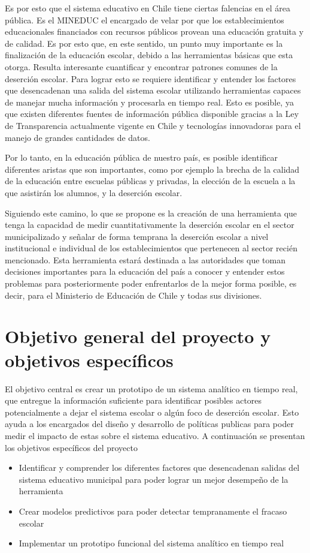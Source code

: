 Es por esto que el sistema educativo en Chile tiene ciertas falencias en el área pública. Es el MINEDUC el encargado de velar por que los establecimientos educacionales financiados con recursos públicos provean una educación gratuita y de calidad. Es por esto que, en este sentido, un punto muy importante es la finalización de la educación escolar, debido a las herramientas básicas que esta otorga. Resulta interesante cuantificar y encontrar patrones comunes de la deserción escolar. Para lograr esto se requiere identificar y entender los factores que desencadenan una salida del sistema escolar utilizando herramientas capaces de manejar mucha información y procesarla en tiempo real. Esto es posible, ya que existen diferentes fuentes de información pública disponible gracias a la Ley de Transparencia \cite{ley} actualmente vigente en Chile y tecnologías innovadoras para el manejo de grandes cantidades de datos.

Por lo tanto, en la educación pública de nuestro país, es posible identificar diferentes aristas que son importantes, como por ejemplo la brecha de la calidad de la educación entre escuelas públicas y privadas, la elección de la escuela a la que asistirán los alumnos, y la deserción escolar.

Siguiendo este camino, lo que se propone es la creación de una herramienta que tenga la capacidad de medir cuantitativamente la deserción escolar en el sector municipalizado y señalar de forma temprana la deserción escolar a nivel institucional e individual de los establecimientos que pertenecen al sector recién mencionado.
Esta herramienta estará destinada a las autoridades que toman decisiones importantes para la educación del país a conocer y entender estos problemas para posteriormente poder enfrentarlos de la mejor forma posible, es decir, para el Ministerio de Educación de Chile y todas sus divisiones. 


\section{Objetivo general del proyecto y objetivos específicos}
El objetivo central es crear un prototipo de un sistema analítico en tiempo real, que entregue la información suficiente para identificar posibles actores potencialmente a dejar el sistema escolar o algún foco de deserción escolar. Esto ayuda a los encargados del diseño y desarrollo de políticas publicas para poder medir el impacto de estas sobre el sistema educativo.
A continuación se presentan los objetivos específicos del proyecto
\begin{itemize}
\item Identificar y comprender los diferentes factores que desencadenan salidas del sistema educativo municipal para poder lograr un mejor desempeño de la herramienta
\item Crear modelos predictivos para poder detectar tempranamente el fracaso escolar
\item Implementar un prototipo funcional del sistema analítico en tiempo real
\end{itemize}

